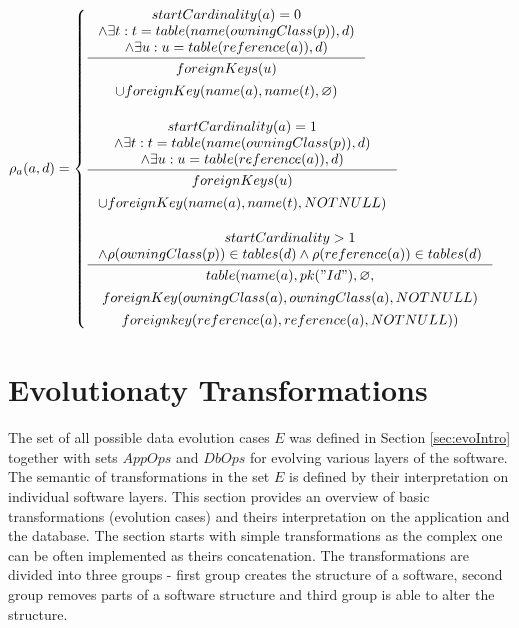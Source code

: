 \documentclass[11pt]{article}
\begin{document}
$
\rho_a(a,d) = \begin{cases}
 \inference{ startCardinality(a) = 0 \\ \wedge \exists t : t = table(name(owningClass(p)), d) \\ \wedge \exists u : u = table(reference(a)), d)}{ 
 \begin{gathered}
 foreignKeys(u) \\ \cup foreignKey(name(a), name(t),  \varnothing) 
 \end{gathered}
 }
  \\ \\
 \inference{ startCardinality(a) = 1 \\ \wedge \exists t : t = table(name(owningClass(p)), d) \\ \wedge \exists u : u = table(reference(a)), d)}{\begin{gathered}  
foreignKeys(u) \\ \cup  foreignKey(name(a), name(t),  NOTNULL) \\
\end{gathered}
} \\ \\
 
  \inference{  startCardinality > 1 \\ \wedge \rho(owningClass(p)) \in tables(d) \wedge \rho(reference(a)) \in tables(d)}{
  \begin{gathered}  
 table(name(a), pk("Id"), \varnothing, \\ foreignKey(owningClass(a),owningClass(a), NOTNULL) \\ foreignkey(reference(a), reference(a), NOTNULL)) 
  \end{gathered}}  
 \end{cases}
$

\section{Evolutionaty Transformations}
The set of all possible data evolution cases $E$ was defined in Section \ref{sec:evoIntro} together with sets $AppOps$ and $DbOps$ for evolving various layers of the software. The semantic of transformations in the set $E$ is defined by their interpretation on individual software layers. This section provides an overview of basic transformations (evolution cases) and theirs interpretation on the application and the database. The section starts with simple transformations as the complex one can be often implemented as theirs concatenation. The transformations are divided into three groups - first group creates the structure of a software, second group removes parts of a software structure and third group is able to alter the structure.
\end{document}
